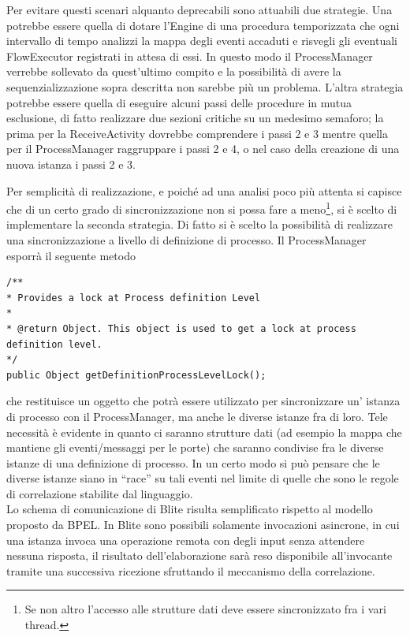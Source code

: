 Per evitare questi scenari alquanto deprecabili sono attuabili due strategie.
Una potrebbe essere quella di dotare l'Engine di una procedura temporizzata che
ogni intervallo di tempo analizzi la mappa degli eventi accaduti e risvegli
gli eventuali FlowExecutor registrati in attesa di essi. In questo modo il
ProcessManager verrebbe sollevato da quest'ultimo compito e la possibilità di
avere la sequenzializzazione sopra descritta non sarebbe più un problema.
L'altra strategia potrebbe essere quella di eseguire alcuni passi delle
procedure in mutua esclusione, di fatto realizzare due sezioni critiche su un
medesimo semaforo; la prima per la ReceiveActivity dovrebbe comprendere i passi
2 e 3 mentre quella per il ProcessManager raggruppare i passi 2 e 4, o nel caso
della creazione di una nuova istanza i passi 2 e 3.

Per semplicità di realizzazione, e poiché ad una analisi poco più attenta si
capisce che di un certo grado di sincronizzazione non si possa fare a meno\footnote{Se
non altro l'accesso alle strutture dati deve essere sincronizzato fra i vari
thread.}, si \`e scelto di implementare la seconda strategia. Di fatto si \`e
scelto la possibilità di realizzare una sincronizzazione a livello di
definizione di processo. Il ProcessManager esporrà il seguente metodo

\begin{lstlisting}
/**
* Provides a lock at Process definition Level
* 
* @return Object. This object is used to get a lock at process definition level.
*/
public Object getDefinitionProcessLevelLock();
\end{lstlisting}

che restituisce un oggetto che potrà essere utilizzato per sincronizzare un'
istanza di processo con il ProcessManager, ma anche le diverse istanze fra di
loro. Tele necessità \`e evidente in quanto ci saranno strutture dati (ad
esempio la mappa che mantiene gli eventi/messaggi per le porte) che saranno
condivise fra le diverse istanze di una definizione di processo. In un certo
modo si può pensare che le diverse istanze siano in ``race'' su tali eventi
nel limite di quelle che sono le regole di correlazione stabilite dal
linguaggio.
\\

Lo schema di comunicazione di Blite risulta semplificato rispetto al modello
proposto da BPEL. In Blite sono possibili solamente invocazioni asincrone, in
cui una istanza invoca una operazione remota con degli input senza attendere
nessuna risposta, il risultato dell'elaborazione sarà reso disponibile
all'invocante tramite una successiva ricezione sfruttando il meccanismo della
correlazione. 

